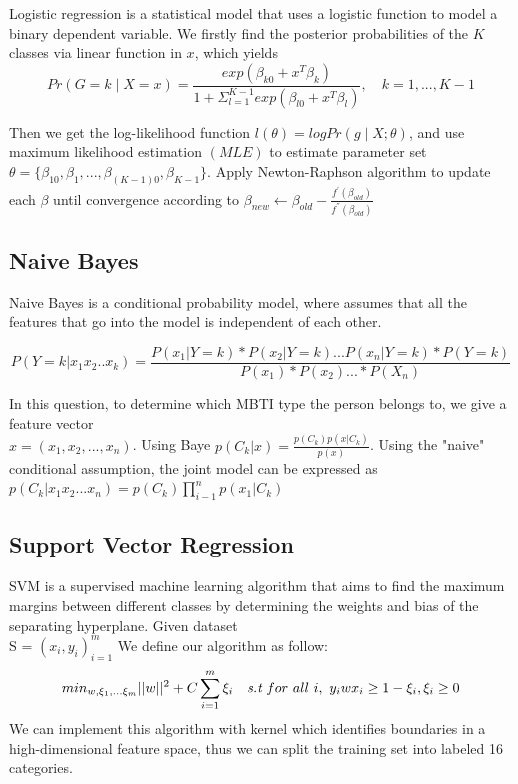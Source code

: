 \documentclass{article}
\begin{document}
Logistic regression is a statistical model that uses a logistic function to model a binary dependent variable. We firstly find the posterior probabilities of the $K$ classes via linear function in $x$, which yields $$Pr\left(G = k\mid X = x\right) = \frac{exp\left(\beta_{k0}+x^{T} \beta_{k}\right)}{1+\Sigma_{l=1}^{K-1}exp\left(\beta_{l0}+x^{T} \beta_{l}\right)},\quad k = 1,...,K-1$$ 

Then we get the log-likelihood function $l(\theta) = logPr\left(g\mid X; \theta\right) $, and use maximum likelihood estimation $\left(MLE\right)$ to estimate parameter set $\theta = \{\beta_{10},\beta_1,...,\beta_{\left(K-1\right)0},\beta_{K-1} \}$. Apply Newton-Raphson algorithm to update each $\beta$ until convergence according to $\beta_{new} \leftarrow \beta_{old} - \frac{f^{'}\left(\beta_{old}\right)}{f^{''}\left(\beta_{old}\right)}$


\subsection{Naive Bayes}
Naive Bayes is a conditional probability model, where  assumes that all the features that go into the model is independent of each other.

$$ P(Y= k|x_1x_2..x_k)= \frac{P(x_1|Y=k)*P(x_2|Y=k)...P(x_n|Y=k)*P(Y = k) }{ P(x_1)*P(x_2)...* P(X_n)}$$

In this question, to determine which MBTI type the person belongs to, we give a feature vector\\ $x = (x_1,x_2,...,x_n)$. Using Baye $ p(C_k|x) = \frac{p(C_k)p(x|C_k)}{p(x)} $. Using the "naive" conditional assumption, the joint model can be expressed as $p(C_k|x_1x_2...x_n) = p(C_k)\prod_{i-1}^n p(x_1|C_k)$ 

\subsection{Support Vector  Regression}

SVM is a supervised machine learning algorithm that aims to find the maximum margins between different classes by determining the weights and bias of the separating hyperplane. Given dataset \\S = ${(x_i,y_i)}_{i=1}^m $ We define our algorithm as follow:
$$ min_{w,\xi_1,...\xi_m}||w||^2 + C\sum_{i=1}^m \xi_i \quad \emph{s.t} \ for \ all \ i, \ y_i w x_i \ge 1 - \xi_i, \xi_i \ge 0 $$
We can implement this algorithm with kernel which identifies boundaries in a high-dimensional feature space, thus  we can split the training set into labeled 16 categories.
\end{document}
